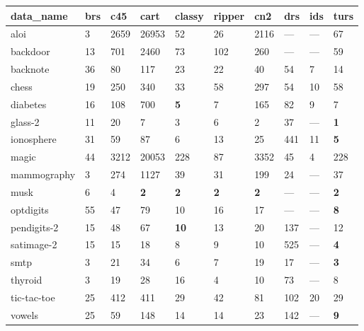 \begin{table}[ht]
\small
\centering
\begin{tabular}{llllllllll}
  \hline
data\_name & brs & c45 & cart & classy & ripper & cn2 & drs & ids & turs \\ 
  \hline
aloi & \scriptsize{3} & \scriptsize{2659} & 26953 & 52 & \scriptsize{26} & 2116 & --- & --- & 67 \\ 
  backdoor & \scriptsize{13} & 701 & 2460 & 73 & 102 & 260 & --- & --- & 59 \\ 
  backnote & 36 & 80 & 117 & 23 & 22 & 40 & 54 & \scriptsize{7} & 14 \\ 
  chess & 19 & 250 & 340 & 33 & 58 & \scriptsize{297} & \scriptsize{54} & \scriptsize{10} & 58 \\ 
  diabetes & 16 & 108 & \scriptsize{700} & \textbf{5} & \scriptsize{7} & 165 & 82 & \scriptsize{9} & 7 \\ 
  glass-2 & \scriptsize{11} & \scriptsize{20} & \scriptsize{7} & \scriptsize{3} & \scriptsize{6} & 2 & 37 & --- & \textbf{1} \\ 
  ionosphere & \scriptsize{31} & 59 & \scriptsize{87} & 6 & 13 & 25 & \scriptsize{441} & \scriptsize{11} & \textbf{5} \\ 
  magic & \scriptsize{44} & 3212 & \scriptsize{20053} & 228 & \scriptsize{87} & \scriptsize{3352} & \scriptsize{45} & \scriptsize{4} & 228 \\ 
  mammography & \scriptsize{3} & \scriptsize{274} & \scriptsize{1127} & 39 & \scriptsize{31} & 199 & 24 & --- & 37 \\ 
  musk & 6 & 4 & \textbf{2} & \textbf{2} & \textbf{2} & \textbf{2} & --- & --- & \textbf{2} \\ 
  optdigits & \scriptsize{55} & 47 & 79 & 10 & 16 & 17 & --- & --- & \textbf{8} \\ 
  pendigits-2 & 15 & 48 & 67 & \textbf{10} & 13 & 20 & 137 & --- & 12 \\ 
  satimage-2 & 15 & 15 & 18 & 8 & 9 & 10 & \scriptsize{525} & --- & \textbf{4} \\ 
  smtp & \scriptsize{3} & 21 & 34 & \scriptsize{6} & 7 & \scriptsize{19} & \scriptsize{17} & --- & \textbf{3} \\ 
  thyroid & \scriptsize{3} & 19 & 28 & 16 & 4 & 10 & 73 & --- & 8 \\ 
  tic-tac-toe & 25 & \scriptsize{412} & 411 & 29 & 42 & 81 & 102 & \scriptsize{20} & 29 \\ 
  vowels & 25 & \scriptsize{59} & 148 & 14 & \scriptsize{14} & 23 & 142 & --- & \textbf{9} \\ 

\end{tabular}
\end{table}
